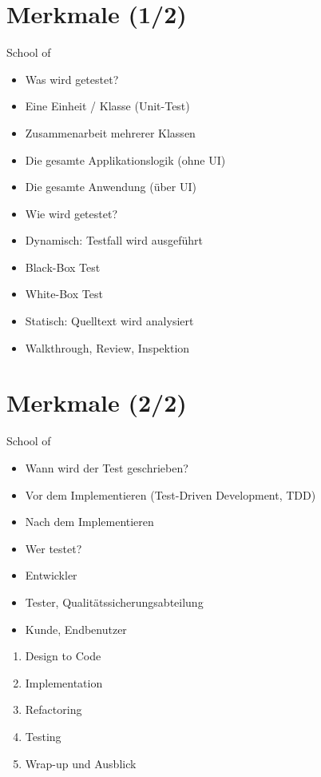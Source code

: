 \documentclass[10pt]{article}
\begin{document}
\section*{Merkmale (1/2)}
School of

\begin{itemize}
  \item Was wird getestet?
  \item Eine Einheit / Klasse (Unit-Test)
  \item Zusammenarbeit mehrerer Klassen
  \item Die gesamte Applikationslogik (ohne UI)
  \item Die gesamte Anwendung (über UI)
  \item Wie wird getestet?
  \item Dynamisch: Testfall wird ausgeführt
  \item Black-Box Test
  \item White-Box Test
  \item Statisch: Quelltext wird analysiert
  \item Walkthrough, Review, Inspektion
\end{itemize}

\section*{Merkmale (2/2)}
School of

\begin{itemize}
  \item Wann wird der Test geschrieben?
  \item Vor dem Implementieren (Test-Driven Development, TDD)
  \item Nach dem Implementieren
  \item Wer testet?
  \item Entwickler
  \item Tester, Qualitätssicherungsabteilung
  \item Kunde, Endbenutzer
\end{itemize}

\begin{enumerate}
  \item Design to Code
  \item Implementation
  \item Refactoring
  \item Testing
  \item Wrap-up und Ausblick
\end{enumerate}
\end{document}
